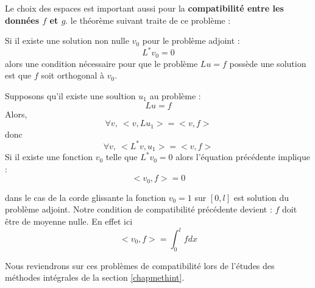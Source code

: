 \documentclass[12pt]{book}
\begin{document}
Le choix des espaces est important aussi pour la {\bf compatibilit\'e
entre les donn\'ees $f$ et $g$}\cite{ma:equad:Dautray1,ph:elect:VanBladel75}.
le th\'eor\`eme suivant traite de ce probl\`eme :
\begin{thm}
Si il existe une solution non nulle $v_0$ pour le probl\`eme adjoint :
\begin{equation}
L^*v_0=0
\end{equation}
alors une condition n\'ecessaire pour que le probl\`eme $Lu=f$
poss\`ede une solution est que $f$ soit orthogonal \`a $v_0$. 
\end{thm}
\begin{pf}
Supposons qu'il existe une soultion $u_1$ au probl\`eme :
\begin{equation}
Lu=f
\end{equation}
Alors,
\begin{equation}
\forall v,\ <v,Lu_1>=<v,f>
\end{equation}
donc 
\begin{equation}
\forall v,\ <L^*v,u_1>=<v,f>
\end{equation}
Si il existe une fonction $v_0$ telle que $L^*v_0=0$ alors l'\'equation
pr\'ec\'edente implique :
\begin{equation}
<v_0,f>=0
\end{equation}
\end{pf}

\begin{exmp}
dans le cas de la corde glissante la fonction $v_0=1$ sur $[0,l]$ est solution
du probl\`eme adjoint. Notre condition de compatibilit\'e pr\'ec\'edente
devient : $f$ doit \^etre de moyenne nulle. En effet ici
\begin{equation}
<v_0,f>=\int_0^lf dx
\end{equation}


\end{exmp}

\begin{rem}
Nous reviendrons sur ces probl\`emes de compatibilit\'e lors de l'\'etudes des
m\'ethodes int\'egrales de la section \ref{chapmethint}.
\end{rem}
\end{document}
